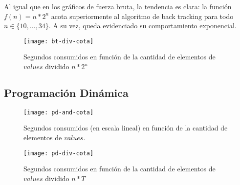 Al igual que en los gráficos de fuerza bruta, la tendencia es clara: la función $f(n)=n*2^n$ acota superiormente al algoritmo de back tracking para todo $n \in \{10, ..., 34\}$. A su vez, queda evidenciado su comportamiento exponencial.

\begin{figure}[H]
	\centering
	\texttt{[image: bt-div-cota]}
	\caption{\footnotesize Segundos consumidos en función de la cantidad de elementos de $values$ dividido $n*2^n$}
	\label{fig:plot-bt-div-cota}
\end{figure}

\subsection{Programación Dinámica}
\begin{figure}[H]
	\centering
	\begin{minipage}{0.48\textwidth}
		\centering
		\texttt{[image: pd-and-cota]}
		\caption{\footnotesize Segundos consumidos (en escala lineal) en función de la cantidad de elementos de $values$.}
		\label{fig:plot-bf-and-cota}
	\end{minipage}%
	\hspace{0.03\textwidth}
	\begin{minipage}{0.48\textwidth}
		\centering
		\texttt{[image: pd-div-cota]}
		\caption{\footnotesize Segundos consumidos en función de la cantidad de elementos de $values$ dividido $n*T$}
		\label{fig:plot-bf-and-cota-log}
	\end{minipage}%
\end{figure}